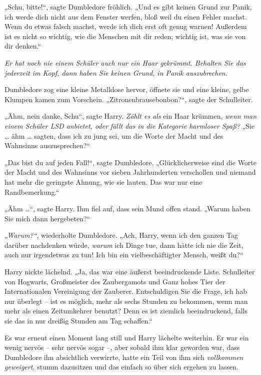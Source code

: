 {„Schu, bitte!“, sagte Dumbledore fröhlich. „Und es gibt keinen Grund zur Panik, ich werde dich nicht aus dem Fenster werfen, bloß weil du einen Fehler machst. Wenn du etwas falsch machst, werde ich dich erst oft genug warnen! Außerdem ist es nicht so wichtig, wie die Menschen mit dir reden; wichtig ist, was sie von dir denken.“

\emph{Er hat noch nie einem Schüler auch nur ein Haar gekrümmt. Behalten Sie das jederzeit im Kopf, dann haben Sie keinen Grund, in Panik auszubrechen.}

Dumbledore zog eine kleine Metalldose hervor, öffnete sie und eine kleine, gelbe Klumpen kamen zum Vorschein. „Zitronenbrausebonbon?“, sagte der Schulleiter.

„Ähm, nein danke, Schu“, sagte Harry. \emph{Zählt es als} ein Haar krümmen, \emph{wenn man einem Schüler LSD anbietet, oder fällt das in die Kategorie harmloser Spaß?} „Sie … ähm … sagten, dass ich zu jung sei, um die Worte der Macht und des Wahnsinns auszusprechen?“

„Das bist du auf jeden Fall!“, sagte Dumbledore. „Glücklicherweise sind die Worte der Macht und des Wahnsinns vor sieben Jahrhunderten verschollen und niemand hat mehr die geringste Ahnung, wie sie lauten. Das war nur eine Randbemerkung.“

„Ähm …“, sagte Harry. Ihm fiel auf, dass sein Mund offen stand. „Warum haben Sie mich dann hergebeten?“

\emph{„Warum?“}, wiederholte Dumbledore. „Ach, Harry, wenn ich den ganzen Tag darüber nachdenken würde, \emph{warum} ich Dinge tue, dann hätte ich nie die Zeit, auch nur irgendetwas zu tun! Ich bin ein vielbeschäftigter Mensch, weißt du?“

Harry nickte lächelnd. „Ja, das war eine äußerst beeindruckende Liste. Schulleiter von Hogwarts, Großmeister des Zaubergamots und Ganz hohes Tier der Internationalen Vereinigung der Zauberer. Entschuldigen Sie die Frage, ich hab nur überlegt -- ist es möglich, mehr als sechs Stunden zu bekommen, wenn man mehr als einen Zeitumkehrer benutzt? Denn es ist ziemlich beeindruckend, falls sie das in nur dreißig Stunden am Tag schaffen.“

Es war erneut einen Moment lang still und Harry lächelte weiterhin. Er war ein wenig nervös -- sehr nervös sogar --, aber sobald ihm klar geworden war, dass Dumbledore ihn absichtlich verwirrte, hatte ein Teil von ihm sich \emph{vollkommen geweigert,} stumm dazusitzen und das einfach so über sich ergehen zu lassen.

}
